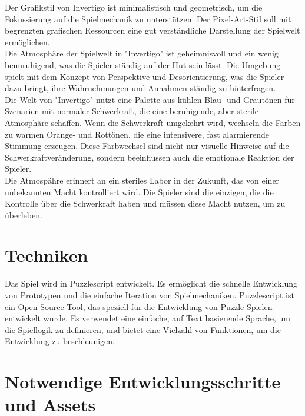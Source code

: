 \documentclass{article}
\begin{document}
Der Grafikstil von Invertigo ist minimalistisch und geometrisch, um die Fokussierung auf die Spielmechanik zu unterstützen.
Der Pixel-Art-Stil soll mit begrenzten grafischen Ressourcen eine gut verständliche Darstellung der Spielwelt ermöglichen.
\\
Die Atmosphäre der Spielwelt in "Invertigo" ist geheimnisvoll und ein wenig beunruhigend, was die Spieler ständig auf der Hut sein lässt.
Die Umgebung spielt mit dem Konzept von Perspektive und Desorientierung, was die Spieler dazu bringt, ihre Wahrnehmungen und Annahmen ständig zu hinterfragen.
\\
Die Welt von "Invertigo" nutzt eine Palette aus kühlen Blau- und Grautönen für Szenarien mit normaler Schwerkraft, die eine beruhigende, aber sterile Atmosphäre schaffen.
Wenn die Schwerkraft umgekehrt wird, wechseln die Farben zu warmen Orange- und Rottönen, die eine intensivere, fast alarmierende Stimmung erzeugen.
Diese Farbwechsel sind nicht nur visuelle Hinweise auf die Schwerkraftveränderung, sondern beeinflussen auch die emotionale Reaktion der Spieler.
\\
Die Atmospähre erinnert an ein steriles Labor in der Zukunft, das von einer unbekannten Macht kontrolliert wird.
Die Spieler sind die einzigen, die die Kontrolle über die Schwerkraft haben und müssen diese Macht nutzen, um zu überleben.

\section{Techniken}
Das Spiel wird in Puzzlescript entwickelt.
Es ermöglicht die schnelle Entwicklung von Prototypen und die einfache Iteration von Spielmechaniken.
Puzzlescript ist ein Open-Source-Tool, das speziell für die Entwicklung von Puzzle-Spielen entwickelt wurde.
Es verwendet eine einfache, auf Text basierende Sprache, um die Spiellogik zu definieren, und bietet eine Vielzahl von Funktionen,
um die Entwicklung zu beschleunigen.

\section{Notwendige Entwicklungsschritte und Assets}
\end{document}
